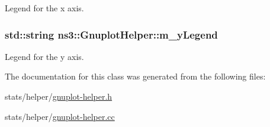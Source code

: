 Legend for the x axis. 

\subsubsection[{\texorpdfstring{m\+\_\+y\+Legend}{m_yLegend}}]{\setlength{\rightskip}{0pt plus 5cm}std\+::string ns3\+::\+Gnuplot\+Helper\+::m\+\_\+y\+Legend\hspace{0.3cm}{\ttfamily [private]}}\hypertarget{classns3_1_1GnuplotHelper_ac0c6b6a1cb5e6d165add24d670026ef2}{}\label{classns3_1_1GnuplotHelper_ac0c6b6a1cb5e6d165add24d670026ef2}


Legend for the y axis. 



The documentation for this class was generated from the following files\+:\begin{DoxyCompactItemize}
\item 
stats/helper/\hyperlink{gnuplot-helper_8h}{gnuplot-\/helper.\+h}\item 
stats/helper/\hyperlink{gnuplot-helper_8cc}{gnuplot-\/helper.\+cc}\end{DoxyCompactItemize}
